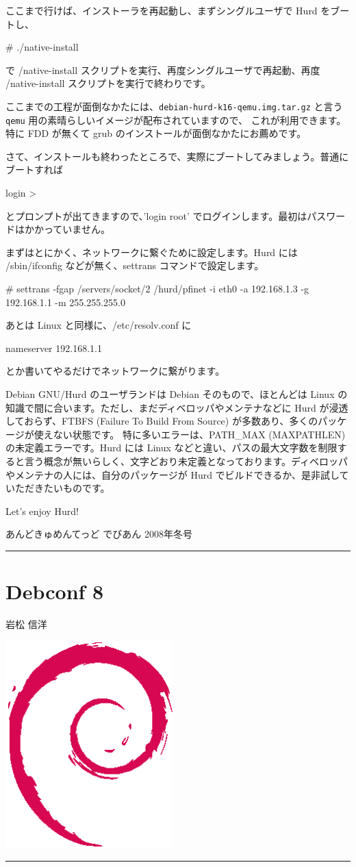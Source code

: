 \documentclass[mingoth,a4paper]{jsarticle}
\renewcommand{\dancersection}[2]{%
\newpage
あんどきゅめんてっど でびあん 2008年冬号
%
\vspace{0.1mm}\\
{\color{dancerlightblue}\rule{\hsize}{2mm}}

%
%
\begin{minipage}[t]{0.6\hsize}
\color{dancerdarkblue}
\vspace{1cm}
\section{#1}
\hfill{}#2\\
\end{minipage}
\begin{minipage}[t]{0.4\hsize}
\vspace{-2cm}
\hfill{}\includegraphics[height=8cm]{image200502/openlogo-nd.eps}\\
\vspace{-5cm}
\end{minipage}
%
%
{\color{dancerdarkblue}\rule{0.74\hsize}{2mm}}
%
\vspace{2cm}
}
\begin{document}
ここまで行けば、インストーラを再起動し、まずシングルユーザで Hurd をブートし、
\begin{commandline}
# ./native-install
\end{commandline}
で /native-install スクリプトを実行、再度シングルユーザで再起動、再度 /native-install スクリプトを実行で終わりです。

ここまでの工程が面倒なかたには、\texttt{debian-hurd-k16-qemu.img.tar.gz} と言う \texttt{qemu} 用の素晴らしいイメージが配布されていますので、
これが利用できます。特に FDD が無くて grub のインストールが面倒なかたにお薦めです。
さて、インストールも終わったところで、実際にブートしてみましょう。普通にブートすれば
\begin{commandline}
login >
\end{commandline}
とプロンプトが出てきますので、'login root' でログインします。最初はパスワードはかかっていません。

まずはとにかく、ネットワークに繋ぐために設定します。Hurd には /sbin/ifconfig などが無く、settrans コマンドで設定します。
\begin{commandline}
# settrans -fgap /servers/socket/2 /hurd/pfinet -i eth0 -a 192.168.1.3 -g 192.168.1.1 -m 255.255.255.0
\end{commandline}
あとは Linux と同様に、/etc/resolv.conf に
\begin{commandline}
nameserver 192.168.1.1
\end{commandline}
とか書いてやるだけでネットワークに繋がります。

Debian GNU/Hurd のユーザランドは Debian そのもので、ほとんどは Linux の知識で間に合います。ただし、まだディベロッパやメンテナなどに Hurd が浸透しておらず、FTBFS (Failure To Build From Source) が多数あり、多くのパッケージが使えない状態です。
特に多いエラーは、PATH\_{}MAX (MAXPATHLEN) の未定義エラーです。Hurd には Linux などと違い、パスの最大文字数を制限すると言う概念が無いらしく、文字どおり未定義となっております。ディベロッパやメンテナの人には、自分のパッケージが Hurd でビルドできるか、是非試していただきたいものです。

Let's enjoy Hurd!



\dancersection{Debconf 8}{岩松 信洋}
\label{sec:debconf8}
\end{document}
